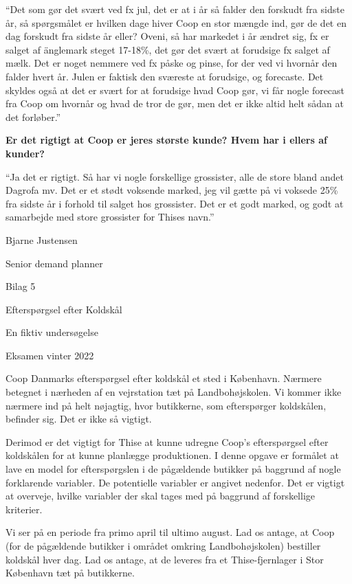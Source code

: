 \documentclass[
  12pt,
  a4paper,
  DIV=11,
  numbers=noendperiod]{scrartcl}
\begin{document}
\begin{itemize}
  ``Det som gør det svært ved fx jul, det er at i år så falder den
  forskudt fra sidste år, så spørgsmålet er hvilken dage hiver Coop en
  stor mængde ind, gør de det en dag forskudt fra sidste år eller?
  Oveni, så har markedet i år ændret sig, fx er salget af änglemark
  steget 17-18\%, det gør det svært at forudsige fx salget af mælk. Det
  er noget nemmere ved fx påske og pinse, for der ved vi hvornår den
  falder hvert år. Julen er faktisk den sværeste at forudsige, og
  forecaste. Det skyldes også at det er svært for at forudsige hvad Coop
  gør, vi får nogle forecast fra Coop om hvornår og hvad de tror de gør,
  men det er ikke altid helt sådan at det forløber.''~

  \textbf{Er det rigtigt at Coop er jeres største kunde? Hvem har i
  ellers af kunder?}~

  ``Ja det er rigtigt. Så har vi nogle forskellige grossister, alle de
  store bland andet Dagrofa mv. Det er et stødt voksende marked, jeg vil
  gætte på vi voksede 25\% fra sidste år i forhold til salget hos
  grossister. Det er et godt marked, og godt at samarbejde med store
  grossister for Thises navn.''~

  Bjarne Justensen~

  Senior demand planner~

  Bilag 5~

  Efterspørgsel efter Koldskål~

  En fiktiv undersøgelse~

  Eksamen vinter 2022~

  Coop Danmarks efterspørgsel efter koldskål et sted i København.
  Nærmere betegnet i nærheden af en vejrstation tæt på Landbohøjskolen.
  Vi kommer ikke nærmere ind på helt nøjagtig, hvor butikkerne, som
  efterspørger koldskålen, befinder sig. Det er ikke så vigtigt.~

  Derimod er det vigtigt for Thise at kunne udregne Coop's efterspørgsel
  efter koldskålen for at kunne planlægge produktionen. I denne opgave
  er formålet at lave en model for efterspørgslen i de pågældende
  butikker på baggrund af nogle forklarende variabler. De potentielle
  variabler er angivet nedenfor. Det er vigtigt at overveje, hvilke
  variabler der skal tages med på baggrund af forskellige kriterier.~

  Vi ser på en periode fra primo april til ultimo august. Lad os antage,
  at Coop (for de pågældende butikker i området omkring Landbohøjskolen)
  bestiller koldskål hver dag. Lad os antage, at de leveres fra et
  Thise-fjernlager i Stor København tæt på butikkerne.~


\end{itemize}
\end{document}
